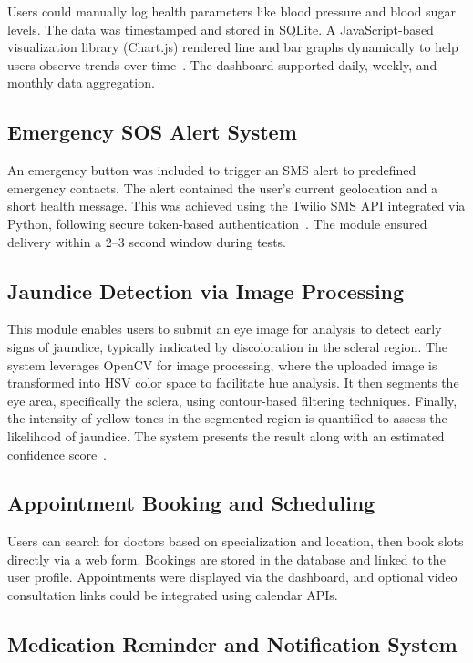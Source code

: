 \documentclass[conference]{IEEEtran}
\begin{document}
Users could manually log health parameters like blood pressure and blood sugar levels. The data was timestamped and stored in SQLite. A JavaScript-based visualization library (Chart.js) rendered line and bar graphs dynamically to help users observe trends over time~\cite{chartjs}. The dashboard supported daily, weekly, and monthly data aggregation.

\subsection{Emergency SOS Alert System}

An emergency button was included to trigger an SMS alert to predefined emergency contacts. The alert contained the user's current geolocation and a short health message. This was achieved using the Twilio SMS API integrated via Python, following secure token-based authentication~\cite{twilio}. The module ensured delivery within a 2–3 second window during tests.

\subsection{Jaundice Detection via Image Processing}
This module enables users to submit an eye image for analysis to detect early signs of jaundice, typically indicated by discoloration in the scleral region. The system leverages OpenCV for image processing, where the uploaded image is transformed into HSV color space to facilitate hue analysis. It then segments the eye area, specifically the sclera, using contour-based filtering techniques. Finally, the intensity of yellow tones in the segmented region is quantified to assess the likelihood of jaundice. The system presents the result along with an estimated confidence score~\cite{opencv}.

\subsection{Appointment Booking and Scheduling}

Users can search for doctors based on specialization and location, then book slots directly via a web form. Bookings are stored in the database and linked to the user profile. Appointments were displayed via the dashboard, and optional video consultation links could be integrated using calendar APIs.

\subsection{Medication Reminder and Notification System}
\end{document}
